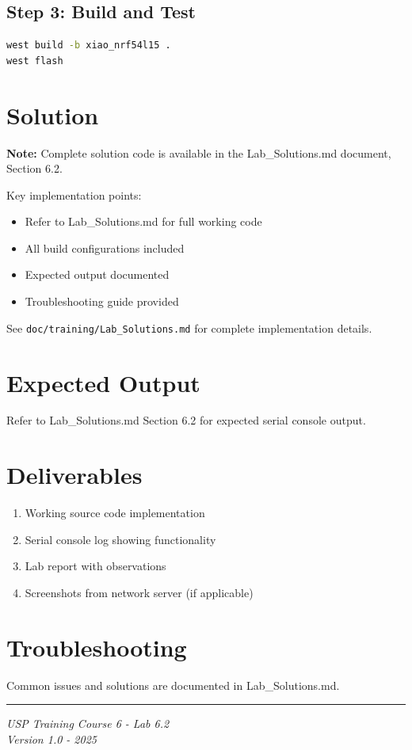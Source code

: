 \documentclass[11pt,a4paper]{article}
\begin{document}
\subsection{Step 3: Build and Test}
\begin{lstlisting}[language=bash]
west build -b xiao_nrf54l15 .
west flash
\end{lstlisting}

\section{Solution}

\begin{solutionbox}
\textbf{Note:} Complete solution code is available in the Lab\_Solutions.md document, Section 6.2.

Key implementation points:
\begin{itemize}
    \item Refer to Lab\_Solutions.md for full working code
    \item All build configurations included
    \item Expected output documented
    \item Troubleshooting guide provided
\end{itemize}

See \texttt{doc/training/Lab\_Solutions.md} for complete implementation details.
\end{solutionbox}

\section{Expected Output}

Refer to Lab\_Solutions.md Section 6.2 for expected serial console output.

\section{Deliverables}

\begin{enumerate}[itemsep=10pt]
    \item Working source code implementation
    \item Serial console log showing functionality
    \item Lab report with observations
    \item Screenshots from network server (if applicable)
\end{enumerate}

\section{Troubleshooting}

Common issues and solutions are documented in Lab\_Solutions.md.

\vfill
\noindent\rule{\textwidth}{0.4pt}
\begin{center}
\textit{USP Training Course 6 - Lab 6.2}\\
\textit{Version 1.0 - 2025}
\end{center}
\end{document}
